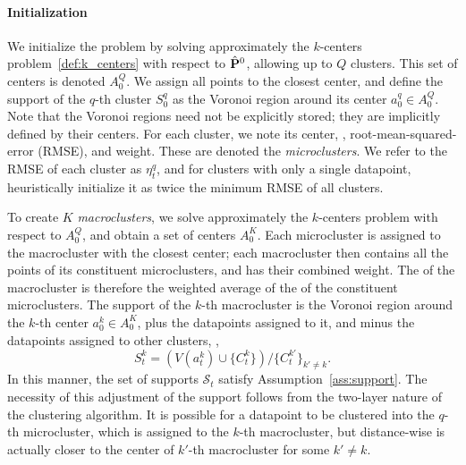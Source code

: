 

\paragraph{Initialization}
We initialize the problem by solving approximately the $k$-centers problem~\eqref{def:k_centers} with respect to $\hat{{\mathbf P}}^0$, allowing up to $Q$ clusters. This set of centers is denoted $A^Q_0$. We assign all points to the closest center, and define the support of the $q$-th cluster $S^q_0$ as the Voronoi region around its center $a_0^q \in A^Q_0$. Note that the Voronoi regions need not be explicitly stored; they are implicitly defined by their centers. 
For each cluster, we note its center, , root-mean-squared-error (RMSE), and weight. These are denoted the {\it microclusters}. We refer to the RMSE of each cluster as $\eta^q_t$, and for clusters with only a single datapoint, heuristically initialize it as twice the minimum RMSE of all clusters. 

To create $K$ {\it macroclusters}, we solve approximately the $k$-centers problem with respect to $A^Q_0$, and obtain a set of centers $A^K_0$. Each microcluster is assigned to the macrocluster with the closest center; each macrocluster then contains all the points of its constituent microclusters, and has their combined weight. The  of the macrocluster is therefore the weighted average of the  of the constituent microclusters. The support of the $k$-th macrocluster is the Voronoi region around the $k$-th center $a_0^k \in A^K_0$, plus the datapoints assigned to it, and minus the datapoints assigned to other clusters, \ie,
\begin{equation}
\label{eq:update_sup}
    S^k_t = (V(a_t^k) \cup \{C^k_t\})/\{C^{k'}_t\}_{k' \neq k}.
\end{equation}
In this manner, the set of supports $\mathcal{S}_t$ satisfy Assumption~\ref{ass:support}. The necessity of this adjustment of the support follows from the two-layer nature of the clustering algorithm. It is possible for a datapoint to be clustered into the $q$-th microcluster, which is assigned to the $k$-th macrocluster, but distance-wise is actually closer to the center of $k'$-th macrocluster for some $k' \neq k$.

